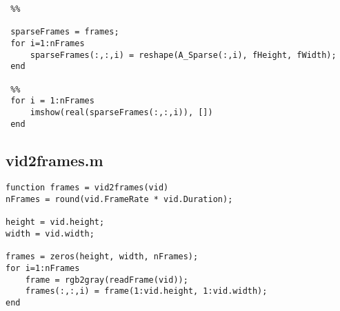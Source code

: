 \documentclass[12pt, a4paper]{article}
\begin{document}
\begin{verbatim}
 %%
 
 sparseFrames = frames;
 for i=1:nFrames
     sparseFrames(:,:,i) = reshape(A_Sparse(:,i), fHeight, fWidth);
 end
 
 %%
 for i = 1:nFrames
     imshow(real(sparseFrames(:,:,i)), [])
 end
 \end{verbatim}
\subsection{vid2frames.m}
\begin{verbatim}
function frames = vid2frames(vid)
nFrames = round(vid.FrameRate * vid.Duration);

height = vid.height;
width = vid.width;

frames = zeros(height, width, nFrames);
for i=1:nFrames
    frame = rgb2gray(readFrame(vid));
    frames(:,:,i) = frame(1:vid.height, 1:vid.width);
end 
 \end{verbatim}
\end{document}
